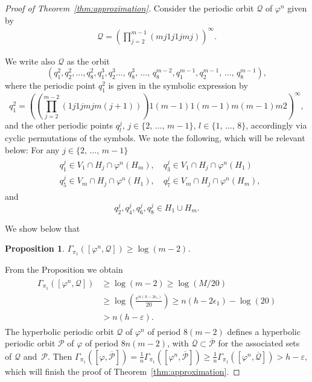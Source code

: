 \documentclass[10pt,a4paper]{amsart}
\numberwithin{equation}{section}
\newcommand{\clP}{\mathcal{P}}
\newcommand{\clQ}{\mathcal{Q}}
\newtheorem{prop}[theo]{Proposition}
\theoremstyle{definition}
\theoremstyle{remark}
\begin{document}
\begin{proof}[Proof of Theorem~\ref{thm:approximation}]
Consider the periodic orbit $\clQ$ of $\varphi^n$ given by
\begin{align*}
\clQ = \left(\prod_{j=2}^{m-1}(mj1j1jmj)\right)^{\infty}.
\end{align*}

We write also $\clQ$ as the orbit
\begin{equation}\label{qqqq}
\left(q_1^2, q_2^2, \ldots, q_8^2, q_1^3, q_2^3 \ldots,\, q_8^3, \,\ldots,\, q_8^{m-2}, q_1^{m-1}, q_2^{m-1},\, \ldots,\, q_8^{m-1}\right),
\end{equation}
where the periodic point $q_1^2$ is given in the symbolic expression by
\[
q_1^2 = \left(\left(\prod_{j=2}^{m-2}(1j1jmjm(j+1))\right) 1(m-1)1(m-1)m(m-1)m2\right)^{\infty},
\]
and the other periodic points $q_l^j$, $j\in \{2,\,\ldots,\, m-1\}$, $l\in \{1,\,\ldots,\,8\}$, accordingly via cyclic permutations of the symbols.
We note the following, which will be relevant below: For any $j \in \{2,\,\ldots,\,m-1\}$
\begin{align}\label{1jm}
\begin{split} 
&q_1^j \in V_1 \cap H_j \cap \varphi^n(H_m), \quad
q_3^j\in V_1 \cap H_j \cap \varphi^n(H_1) \\
& q_5^j\in V_m \cap H_j \cap \varphi^n(H_1), \quad q_7^j\in V_m \cap H_j \cap \varphi^n(H_m),
\end{split}
\end{align}
and
\begin{equation}\label{11mm}
q_2^j,q_4^j, q_6^j, q_8^j \in H_1 \cup H_m.
\end{equation}



We show below that

\begin{prop}\label{prop:entropybound}
$\Gamma_{\pi_1}([\varphi^n, \clQ]) \geq \log(m-2)$.
\end{prop}

From the Proposition we obtain
\begin{align}
\begin{split}
\Gamma_{\pi_1}([\varphi^n, \clQ]) &\geq \log(m-2) \geq \log(M/20) \\ &\geq \log\left(\frac{e^{n(h-2\epsilon_1)}}{20}\right) \geq n(h-2\epsilon_1) - \log(20) \\ &> n(h-\varepsilon).
\end{split}
\end{align}
The hyperbolic periodic orbit $\clQ$ of $\varphi^n$ of period $8(m-2)$ defines a hyperbolic periodic orbit $\clP$ of $\varphi$ of period $8n(m-2)$, with $\overline{\clQ} \subset \overline{\clP}$ for the associated sets of $\clQ$ and~$\clP$. Then $\Gamma_{\pi_1}([\varphi,\overline{\clP}]) = \frac{1}{n}\Gamma_{\pi_1}([\varphi^n,\overline{\clP}]) \geq \frac{1}{n} \Gamma_{\pi_1}([\varphi^n, \overline{\clQ}]) > h-\varepsilon$, which will finish the proof of Theorem~\ref{thm:approximation}.
\end{proof}
\end{document}
